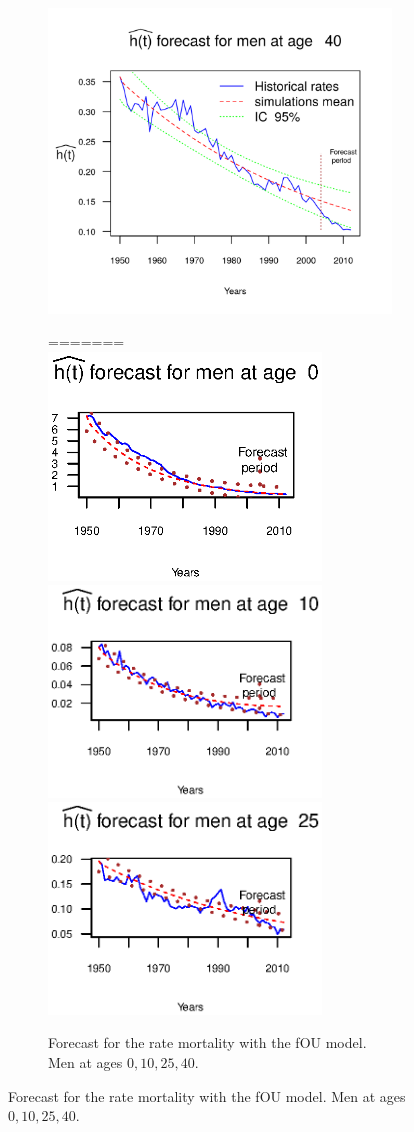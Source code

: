 \documentclass[smallextended]{svjour3}
\begin{document}
\begin{figure}[H]
\begin{figure}[H]
    \includegraphics{PlotMenForecast40.png}
    \caption{Forecast for the rate mortality with the fOU model. Men at ages
    $0,10,25,40$.}
=======
    \includegraphics[width = 2.85in]{PlotMenForecast0.eps}
    \includegraphics[width = 2.85in]{PlotMenForecast10.eps}
    \includegraphics[width = 2.85in]{PlotMenForecast25.eps}

\end{figure}
\end{figure}
\end{document}

